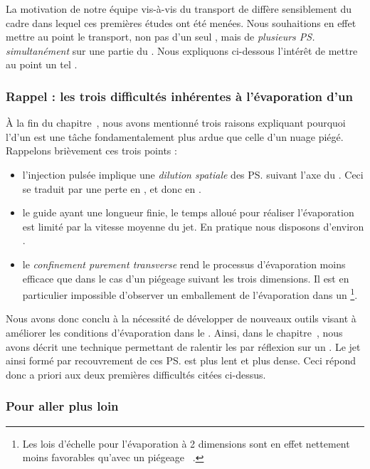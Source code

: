 La motivation de notre équipe vis-à-vis du transport de \patufs diffère sensiblement du cadre dans lequel ces premières études ont été menées. Nous souhaitions en effet mettre au point le transport, non pas d'un seul \p, mais de \emph{plusieurs \ps simultanément} sur une partie du \gm. Nous expliquons ci-dessous l'intérêt de mettre au point un tel \setup.


\subsubsection{Rappel : les trois difficultés inhérentes à l'évaporation d'un \jatg}
\`A la fin du chapitre~, nous avons mentionné trois raisons expliquant pourquoi l'\evap d'un \jat est une tâche fondamentalement plus ardue que celle d'un nuage piégé. Rappelons brièvement ces trois points :
\begin{itemize}
	\item l'injection pulsée implique une \emph{dilution spatiale} des \ps suivant l'axe du \gm. Ceci se traduit par une perte en \dat, et donc en \tcolel.
	\item le guide ayant une longueur finie, le temps alloué pour réaliser l'évaporation est limité par la vitesse moyenne du jet. En pratique nous disposons d'environ .
	\item le \emph{confinement purement transverse} rend le processus d'évaporation moins efficace que dans le cas d'un piégeage suivant les trois dimensions. Il est en particulier impossible d'observer un emballement de l'évaporation dans un \ppthar%
\footnote{Les lois d'échelle pour l'évaporation à 2 dimensions sont en effet nettement moins favorables qu'avec un piégeage \td~\cite{LaG06,DMK95,KeV96}.}. 
\end{itemize}
Nous avons donc conclu à la nécessité de développer de nouveaux outils visant à améliorer les conditions d'évaporation dans le \gm. Ainsi, dans le chapitre~, nous avons décrit une technique permettant de ralentir les \pats par réflexion sur un \mimamo. Le jet ainsi formé par recouvrement de ces \ps est plus lent et plus dense. Ceci répond donc a priori aux deux premières difficultés citées ci-dessus.



\subsubsection{Pour aller plus loin}

